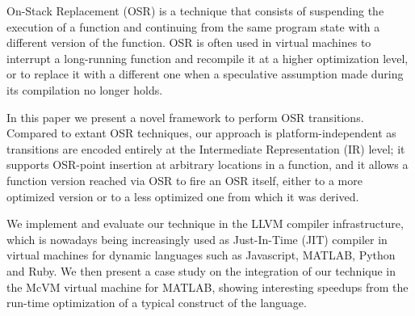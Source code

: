 On-Stack Replacement (OSR) is a technique that consists of suspending the execution of a function and continuing from the same program state with a different version of the function. OSR is often used in virtual machines to interrupt a long-running function and recompile it at a higher optimization level, or to replace it with a different one when a speculative assumption made during its compilation no longer holds.

In this paper we present a novel framework to perform OSR transitions. Compared to extant OSR techniques, our approach is platform-independent as transitions are encoded entirely at the Intermediate Representation (IR) level; it supports OSR-point insertion at arbitrary locations in a function, and it allows a function version reached via OSR to fire an OSR itself, either to a more optimized version or to a less optimized one from which it was derived.

We implement and evaluate our technique in the LLVM compiler infrastructure, which is nowadays being increasingly used as Just-In-Time (JIT) compiler in virtual machines for dynamic languages such as Javascript, MATLAB, Python and Ruby. We then present a case study on the integration of our technique in the McVM virtual machine for MATLAB, showing interesting speedups from the run-time optimization of a typical construct of the language.
  
  
  
  
  
  
  
  